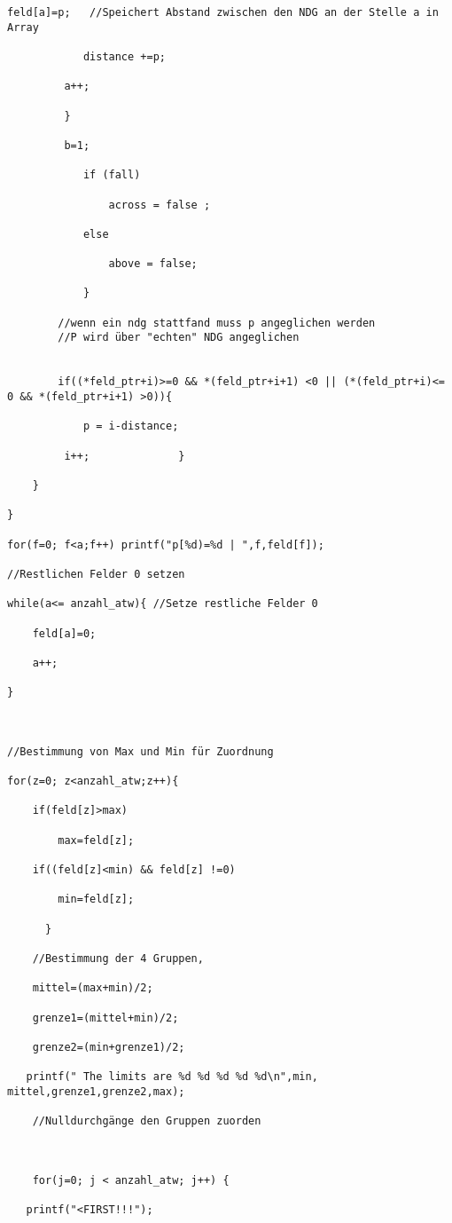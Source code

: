 \documentclass[a4paper,12pt]{article}
\begin{document}
\begin{lstlisting}[caption={histo.c}]
			feld[a]=p;   //Speichert Abstand zwischen den NDG an der Stelle a in Array

			distance +=p;

         a++;

         }

         b=1;

			if (fall)

				across = false ;

			else

				above = false;

			}

		//wenn ein ndg stattfand muss p angeglichen werden
		//P wird über "echten" NDG angeglichen


		if((*feld_ptr+i)>=0 && *(feld_ptr+i+1) <0 || (*(feld_ptr+i)<= 0 && *(feld_ptr+i+1) >0)){

			p = i-distance;

         i++;              }

	}

}

for(f=0; f<a;f++) printf("p[%d)=%d | ",f,feld[f]);

//Restlichen Felder 0 setzen

while(a<= anzahl_atw){ //Setze restliche Felder 0

	feld[a]=0;

	a++;

}



//Bestimmung von Max und Min für Zuordnung

for(z=0; z<anzahl_atw;z++){

	if(feld[z]>max)

		max=feld[z];

	if((feld[z]<min) && feld[z] !=0)

		min=feld[z];

      }

	//Bestimmung der 4 Gruppen,

	mittel=(max+min)/2;

	grenze1=(mittel+min)/2;

	grenze2=(min+grenze1)/2;

   printf(" The limits are %d %d %d %d %d\n",min, mittel,grenze1,grenze2,max);

	//Nulldurchgänge den Gruppen zuorden



	for(j=0; j < anzahl_atw; j++) {

   printf("<FIRST!!!");


\end{lstlisting}
\end{document}
